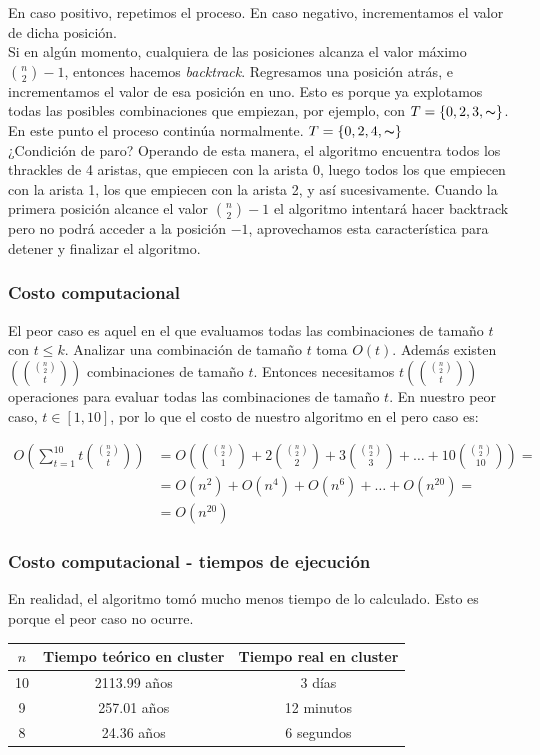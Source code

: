 \begin{frame}
En caso positivo, repetimos el proceso. En caso negativo, incrementamos el valor de dicha posición. \\[10pt]\pause
Si en algún momento, cualquiera de las posiciones alcanza el valor máximo $\binom{n}{2}-1$, entonces hacemos \emph{backtrack}. Regresamos una posición atrás, e incrementamos el valor de esa posición en uno. Esto es porque ya explotamos todas las posibles combinaciones que empiezan, por ejemplo, con $T=\{0,2,3,\thicksim\}$. En este punto el proceso continúa normalmente. $T=\{0,2,4,\thicksim\}$ \\[10pt]
¿Condición de paro? Operando de esta manera, el algoritmo encuentra todos los thrackles de 4 aristas, que empiecen con la arista 0, luego todos los que empiecen con la arista 1, los que empiecen con la arista 2, y así sucesivamente. \pause Cuando la primera posición alcance el valor $\binom{n}{2}-1$ el algoritmo intentará hacer backtrack pero no podrá acceder a la posición $-1$, aprovechamos esta característica para detener y finalizar el algoritmo.
\end{frame}
\begin{frame}\frametitle{Costo computacional}
El peor caso es aquel en el que evaluamos todas las combinaciones de tamaño $t$ con $t \leq k$. Analizar una combinación de tamaño $t$ toma $O(t)$. Además existen $\left(\binom{\binom{n}{2}}{t}\right)$ combinaciones de tamaño $t$. Entonces necesitamos $t\left(\binom{\binom{n}{2}}{t}\right)$ operaciones para evaluar todas las combinaciones de tamaño $t$. En nuestro peor caso, $t\in[1,10]$, por lo que el costo de nuestro algoritmo en el pero caso es:

\begin{align*}
	\displaystyle O\left( \sum_{t=1}^{10} t\binom{\binom{n}{2}}{t} \right) &= 
	O\left(\binom{\binom{n}{2}}{1} + 2\binom{\binom{n}{2}}{2} + 3\binom{\binom{n}{2}}{3} +\dots+ 10\binom{\binom{n}{2}}{10} \right) = \\ &=
	 O(n^2)+ O(n^4)+ O(n^6) + \dots + O(n^{20}) = \\ &=O(n^{20})
\end{align*}

\end{frame}
\begin{frame}
\frametitle{Costo computacional - tiempos de ejecución}
En realidad, el algoritmo tomó mucho menos tiempo de lo calculado. Esto es porque el peor caso no ocurre. 
\begin{table}
	\centering
	\begin{tabular}{|c|c|c|}
		\hline
		$n$      & Tiempo teórico en cluster & Tiempo real en cluster \\ \hline
		10       &     2113.99 años          & 3 días \\   \hline
		9        &     257.01 años           & 12 minutos \\    \hline
		8        &     24.36 años            & 6 segundos \\  \hline
	\end{tabular}
\end{table}
\end{frame}
